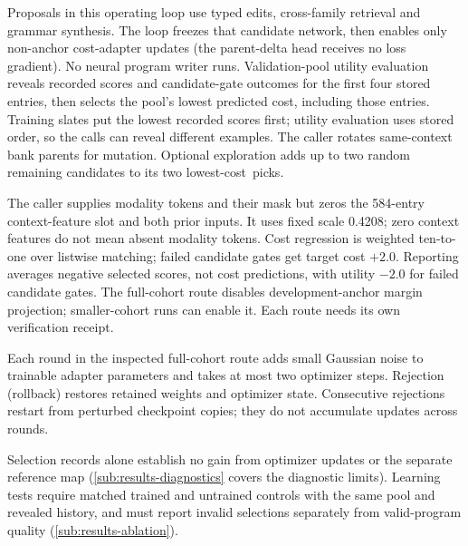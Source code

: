 Proposals in this operating loop use typed edits, cross-family retrieval
and grammar synthesis. The loop freezes that candidate network, then enables
only non-anchor cost-adapter updates (the parent-delta head receives no
loss gradient). No neural program writer runs.
Validation-pool utility evaluation reveals recorded scores and candidate-gate
outcomes for the first four stored entries, then selects the pool's lowest
predicted cost, including those entries. Training slates put the lowest recorded scores first;
utility evaluation uses stored order, so the calls can reveal different
examples. The caller rotates same-context bank parents for mutation. Optional
exploration adds up to two random remaining candidates to its two
\mbox{lowest-cost picks}.

The caller supplies modality tokens and their mask but zeros the 584-entry
context-feature slot and both prior inputs. It uses fixed scale \num{0.4208};
zero context features do not mean absent modality tokens. Cost regression
is weighted ten-to-one over listwise matching; failed candidate gates get target cost
$+2.0$. Reporting averages negative selected scores, not cost predictions,
with utility $-2.0$ for failed candidate gates. The full-cohort route disables
development-anchor margin projection; smaller-cohort runs can enable it.
Each route needs its own verification receipt.

Each round in the inspected full-cohort route adds small Gaussian noise
to trainable adapter parameters and takes at most two optimizer steps.
Rejection (rollback) restores retained weights and optimizer state. Consecutive
rejections restart from perturbed checkpoint copies; they do not accumulate
updates across rounds.

Selection records alone establish no gain from optimizer updates or the
separate reference map (\cref{sub:results-diagnostics} covers the diagnostic
limits). Learning tests require matched trained and untrained controls
with the same pool and revealed history, and must report invalid selections
separately from valid-program quality (\cref{sub:results-ablation}).
